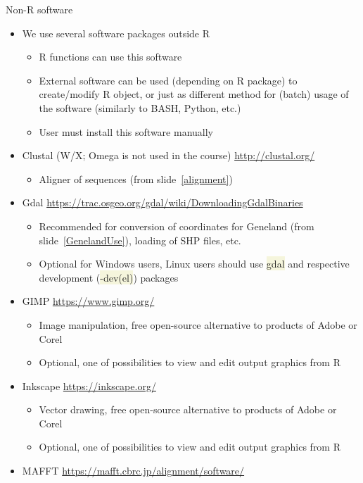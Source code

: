 \documentclass[compress, ucs, xelatex, 11pt, xcolor=svgnames, aspectratio=169,
	hyperref={
		bookmarks=true,
		unicode=true,
		colorlinks=true,
		pdftitle={Molecular data in R},
		plainpages=false,
		pdfauthor={Vojtech Zeisek},
		pdfsubject={Course about phylogeny and evolution in R},
		pdfcreator={XeLaTeX},
		pdfkeywords={R, evolution, phylogeny, molecular data},
		linkcolor=Crimson, %
		anchorcolor=Magenta, %
		citecolor=Magenta, %
		filecolor=Magenta, %
		menucolor=Magenta, %
		urlcolor=DodgerBlue, %
		pdftex},
	url={hyphens, lowtilde} %
	]{beamer}
\renewcommand{\texttt}[1]{\colorbox{Beige}{{\ttfamily #1}}}
\begin{document}
\begin{frame}[allowframebreaks]{Non-R software}
	\begin{itemize}
		\item We use several software packages outside R
		\begin{itemize}
			\item R functions can use this software
			\item External software can be used (depending on R package) to create/modify R object, or just as different method for (batch) usage of the software (similarly to BASH, Python, etc.)
			\item User must install this software manually
		\end{itemize}
		\item Clustal (W/X; Omega is not used in the course) \url{http://clustal.org/}
		\begin{itemize}
			\item Aligner of sequences (from slide~\ref{alignment})
		\end{itemize}
		\item Gdal \url{https://trac.osgeo.org/gdal/wiki/DownloadingGdalBinaries}
		\begin{itemize}
			\item Recommended for conversion of coordinates for Geneland (from slide~\ref{GenelandUse}), loading of SHP files, etc.
			\item Optional for Windows users, Linux users should use \texttt{gdal} and respective development (\texttt{-dev(el)}) packages
		\end{itemize}
		\item GIMP \url{https://www.gimp.org/}
		\begin{itemize}
			\item Image manipulation, free open-source alternative to products of Adobe or Corel
			\item Optional, one of possibilities to view and edit output graphics from R
		\end{itemize}
		\item Inkscape \url{https://inkscape.org/}
		\begin{itemize}
			\item Vector drawing, free open-source alternative to products of Adobe or Corel
			\item Optional, one of possibilities to view and edit output graphics from R
		\end{itemize}
		\item MAFFT \url{https://mafft.cbrc.jp/alignment/software/}

\end{itemize}
\end{frame}
\end{document}
